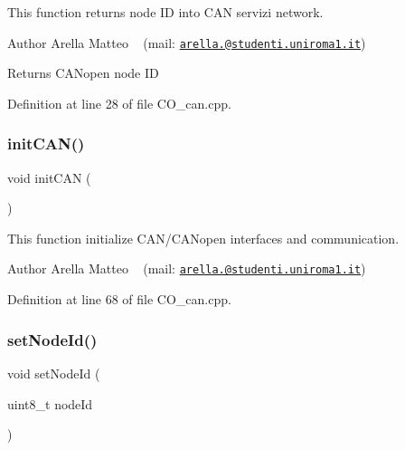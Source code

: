 This function returns node ID into C\+AN servizi network. 

\begin{DoxyAuthor}{Author}
Arella Matteo ~\newline
 (mail\+: \href{mailto:arella.1646983@studenti.uniroma1.it}{\tt arella.@studenti.\+uniroma1.\+it})
\end{DoxyAuthor}
\begin{DoxyReturn}{Returns}
C\+A\+Nopen node ID 
\end{DoxyReturn}


Definition at line 28 of file C\+O\+\_\+can.\+cpp.

\mbox{\label{group___c_a_n__network__module_gaee4f95b5d4a9e9c330f3a9169464860a}} 
\subsubsection{\texorpdfstring{init\+C\+A\+N()}{initCAN()}}
{\footnotesize\ttfamily void init\+C\+AN (\begin{DoxyParamCaption}{ }\end{DoxyParamCaption})}



This function initialize C\+A\+N/\+C\+A\+Nopen interfaces and communication. 

\begin{DoxyAuthor}{Author}
Arella Matteo ~\newline
 (mail\+: \href{mailto:arella.1646983@studenti.uniroma1.it}{\tt arella.@studenti.\+uniroma1.\+it}) 
\end{DoxyAuthor}


Definition at line 68 of file C\+O\+\_\+can.\+cpp.

\mbox{\label{group___c_a_n__network__module_ga9c3b7582805e01be4b88b6648b42837e}} 
\subsubsection{\texorpdfstring{set\+Node\+Id()}{setNodeId()}}
{\footnotesize\ttfamily void set\+Node\+Id (\begin{DoxyParamCaption}\item[{uint8\+\_\+t}]{node\+Id }\end{DoxyParamCaption})}



